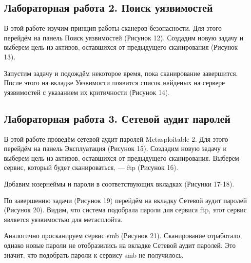 \FloatBarrier
\clearpage



\subsection{Лабораторная работа 2. Поиск уязвимостей}
В этой работе изучим принцип работы сканеров безопасности. Для этого перейдём на панель Поиск уязвимостей (Рисунок 12). Создадим новую задачу и выберем цель из активов, оставшихся от предыдущего сканирования (Рисунок 13).

\FloatBarrier

Запустим задачу и подождём некоторое время, пока сканирование завершится. После этого на вкладке Уязвимости появится список найденых на сервере уязвимостей с указанием их критичности (Рисунок 14).

\FloatBarrier
\clearpage



\subsection{Лабораторная работа 3. Сетевой аудит паролей}
В этой работе проведём сетевой аудит паролей Metasploitable 2. Для этого перейдём на панель Эксплуатация (Рисунок 15). Создадим новую задачу и выберем цель из активов, оставшихся от предыдущего сканирования. Выберем сервис, который будет сканироваться, — ftp (Рисунок 16).

\FloatBarrier

Добавим юзернеймы и пароли в соответствующих вкладках (Рисунки 17-18). 

\FloatBarrier

По завершению задачи (Рисунок 19) перейдём на вкладку Сетевой аудит паролей (Рисунок 20). Видим, что система подобрала пароли для сервиса ftp, этот сервис является уязвимостью для метасплойта.

\FloatBarrier

Аналогично просканируем сервис smb (Рисунок 21). Сканирование отработало, однако новые пароли не отобразились на вкладке Сетевой аудит паролей. Это значит, что подобрать пароли к сервису smb не получилось.

